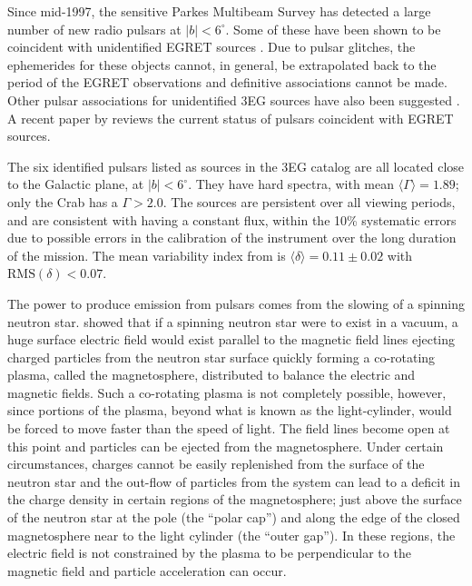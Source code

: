 Since mid-1997, the sensitive Parkes Multibeam Survey
\citep{REF::MANCHESTER::MNRAS2001} has detected a large number of new
radio pulsars at $|b|<6^\circ$. Some of these have been shown to
be coincident with unidentified EGRET sources
\citep{REF::MANCHESTER::NSSR2002}. Due to pulsar glitches, the
ephemerides for these objects cannot, in general, be extrapolated
back to the period of the EGRET observations and definitive
associations cannot be made. Other pulsar associations for
unidentified 3EG sources have also been suggested
\citep{REF::ROBERTS::APJ2002, REF::BRAJE:APJ2002,
REF::ROBERTS::APJ2001, REF::DAMICO::APJ2001}.  A recent paper by
\citet{REF::TORRES::PR2003} reviews the current status of pulsars
coincident with EGRET sources.

The six identified pulsars listed as sources in the 3EG catalog are
all located close to the Galactic plane, at $|b|<6^\circ$. They have
hard spectra, with mean $\langle\Gamma\rangle=1.89$; only the Crab has
a $\Gamma>2.0$. The sources are persistent over all viewing periods,
and are consistent with having a constant flux, within the 10\%
systematic errors due to possible errors in the calibration of the
instrument over the long duration of the mission. The mean variability
index from \citet{REF::NOLAN::APJ2003} is
$\langle\delta\rangle=0.11\pm0.02$ with $\mathrm{RMS}(\delta)<0.07$.

The power to produce emission from pulsars comes from the slowing of a
spinning neutron star. \citet{REF::GOLDREICH_JULIAN::APJ1969} showed
that if a spinning neutron star were to exist in a vacuum, a huge
surface electric field would exist parallel to the magnetic field
lines ejecting charged particles from the neutron star surface quickly
forming a co-rotating plasma, called the magnetosphere, distributed to
balance the electric and magnetic fields. Such a co-rotating plasma is
not completely possible, however, since portions of the plasma, beyond
what is known as the light-cylinder, would be forced to move faster
than the speed of light. The field lines become open at this point and
particles can be ejected from the magnetosphere. Under certain
circumstances, charges cannot be easily replenished from the surface
of the neutron star and the out-flow of particles from the system can
lead to a deficit in the charge density in certain regions of the
magnetosphere; just above the surface of the neutron star at the pole
(the ``polar cap'') and along the edge of the closed magnetosphere
near to the light cylinder (the ``outer gap''). In these regions, the
electric field is not constrained by the plasma to be perpendicular to
the magnetic field and particle acceleration can occur.

